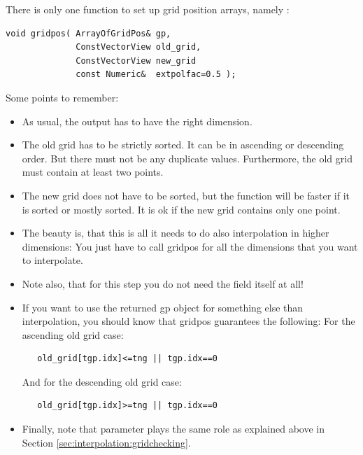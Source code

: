 There is only one function to set up grid position arrays, namely 
:

\begin{lstlisting}
void gridpos( ArrayOfGridPos& gp,
              ConstVectorView old_grid,
              ConstVectorView new_grid 
              const Numeric&  extpolfac=0.5 );
\end{lstlisting}

\hspace{-\parindent}Some points to remember:
\begin{itemize}
\item As usual, the output  has to have the right dimension. 
  
\item The old grid has to be strictly sorted. It can be in ascending
  or descending order. But there must not be any duplicate values.
  Furthermore, the old grid must contain at least two points.
  
\item   The new grid does not have to be sorted, but the function will be
  faster if it is sorted or mostly sorted. It is ok if the new grid
  contains only one point.
  
\item   The beauty is, that this is all it needs to do also interpolation in
  higher dimensions: You just have to call gridpos for all the
  dimensions that you want to interpolate.
  
\item   Note also, that for this step you do not need the field itself at
  all!

\item   If you want to use the returned gp object for something else
  than interpolation, you should know that gridpos guarantees the
  following:\newline
  For the ascending old grid case: 
   \begin{lstlisting}
   old_grid[tgp.idx]<=tng || tgp.idx==0
   \end{lstlisting}

  And for the descending old grid case: 
   \begin{lstlisting}
   old_grid[tgp.idx]>=tng || tgp.idx==0
   \end{lstlisting}

\item   Finally, note that parameter  plays the
  same role as explained above in Section
  \ref{sec:interpolation:gridchecking}. 
\end{itemize}

